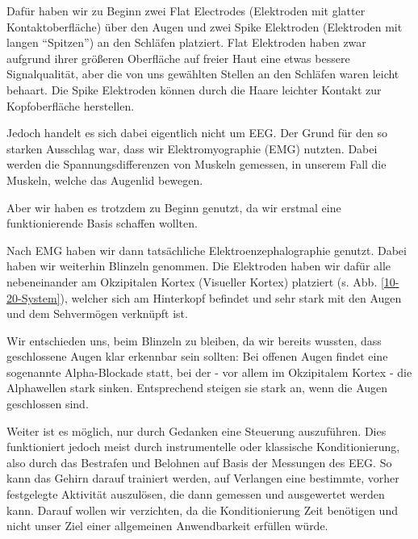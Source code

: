 \documentclass[11pt]{scrartcl}
\begin{document}
	Dafür haben wir zu Beginn zwei Flat Electrodes (Elektroden mit glatter Kontaktoberfläche) über den Augen und zwei Spike Elektroden (Elektroden mit langen \enquote{Spitzen}) an den Schläfen platziert. Flat Elektroden haben zwar aufgrund ihrer größeren Oberfläche auf freier Haut eine etwas bessere Signalqualität, aber die von uns gewählten Stellen an den Schläfen waren leicht behaart. Die Spike Elektroden können durch die Haare leichter Kontakt zur Kopfoberfläche herstellen.

	Jedoch handelt es sich dabei eigentlich nicht um EEG. Der Grund für den so starken Ausschlag war, dass wir Elektromyographie (EMG) nutzten. Dabei werden die Spannungsdifferenzen von Muskeln gemessen, in unserem Fall die Muskeln, welche das Augenlid bewegen. \cite{wiki:EMG}

	Aber wir haben es trotzdem zu Beginn genutzt, da wir erstmal eine funktionierende Basis schaffen wollten.

	Nach EMG haben wir dann tatsächliche Elektroenzephalographie genutzt. Dabei haben wir weiterhin Blinzeln genommen. Die Elektroden haben wir dafür alle nebeneinander am Okzipitalen Kortex (Visueller Kortex) platziert (s. Abb. \ref{10-20-System}), welcher sich am Hinterkopf befindet und sehr stark mit den Augen und dem Sehvermögen verknüpft ist. \cite{Birbaumer2010} 

	Wir entschieden uns, beim Blinzeln zu bleiben, da wir bereits wussten, dass geschlossene Augen klar erkennbar sein sollten: Bei offenen Augen findet eine sogenannte Alpha-Blockade statt, bei der - vor allem im Okzipitalem Kortex - die Alphawellen stark sinken. Entsprechend steigen sie stark an, wenn die Augen geschlossen sind. \cite{Praktikum} \cite{Springer:Berger} \cite{wiki:Berger-Effekt}

	Weiter ist es möglich, nur durch Gedanken eine Steuerung auszuführen. Dies funktioniert jedoch meist durch instrumentelle oder klassische Konditionierung, also durch das Bestrafen und Belohnen auf Basis der Messungen des EEG. So kann das Gehirn darauf trainiert werden, auf Verlangen eine bestimmte, vorher festgelegte Aktivität auszulösen, die dann gemessen und ausgewertet werden kann. \cite{BCIChaudhary} Darauf wollen wir verzichten, da die Konditionierung Zeit benötigen und nicht unser Ziel einer allgemeinen Anwendbarkeit erfüllen würde.

\end{document}
